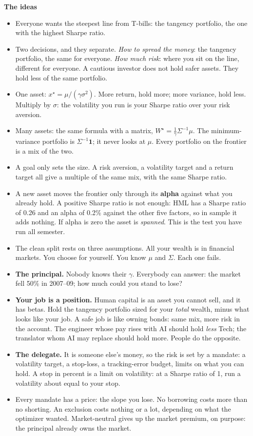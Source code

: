 \documentclass[11pt]{article}
\newcounter{ex}[section]
\newcommand{\head}[1]{\par\medskip\textbf{#1}\par}
\begin{document}
\head{The ideas}
\begin{itemize}
\item Everyone wants the steepest line from T-bills: the tangency portfolio, the one with the highest Sharpe ratio.
\item Two decisions, and they separate. \emph{How to spread the money}: the tangency portfolio, the same for everyone.
\emph{How much risk}: where you sit on the line, different for everyone. A cautious investor does not hold safer assets.
They hold less of the same portfolio.
\item One asset: $x^{\star} = \mu/(\gamma\sigma^{2})$. More return, hold more; more variance, hold less. Multiply by
$\sigma$: the volatility you run is your Sharpe ratio over your risk aversion.
\item Many assets: the same formula with a matrix, $W^{\star} = \frac{1}{\gamma}\Sigma^{-1}\mu$. The minimum-variance
portfolio is $\Sigma^{-1}\mathbf{1}$; it never looks at $\mu$. Every portfolio on the frontier is a mix of the two.
\item A goal only sets the size. A risk aversion, a volatility target and a return target all give a multiple of the same
mix, with the same Sharpe ratio.
\item A new asset moves the frontier only through its \textbf{alpha} against what you already hold. A positive Sharpe
ratio is not enough: HML has a Sharpe ratio of 0.26 and an alpha of 0.2\% against the other five factors, so in sample
it adds nothing. If alpha is zero the asset is \emph{spanned}. This is the test you have run all semester.
\item The clean split rests on three assumptions. All your wealth is in financial markets. You choose for yourself.
You know $\mu$ and $\Sigma$. Each one fails.
\item \textbf{The principal.} Nobody knows their $\gamma$. Everybody can answer: the market fell 50\% in 2007--09; how much
could you stand to lose?
\item \textbf{Your job is a position.} Human capital is an asset you cannot sell, and it has betas. Hold the tangency
portfolio sized for your \emph{total} wealth, minus what looks like your job. A safe job is like owning bonds: same mix,
more risk in the account. The engineer whose pay rises with AI should hold \emph{less} Tech; the translator whom AI may
replace should hold more. People do the opposite.
\item \textbf{The delegate.} It is someone else's money, so the risk is set by a mandate: a volatility target, a
stop-loss, a tracking-error budget, limits on what you can hold. A stop in percent is a limit on volatility: at a Sharpe
ratio of 1, run a volatility about equal to your stop.
\item Every mandate has a price: the slope you lose. No borrowing costs more than no shorting. An exclusion costs
nothing or a lot, depending on what the optimizer wanted. Market-neutral gives up the market premium, on purpose: the
principal already owns the market.
\end{itemize}
\end{document}
